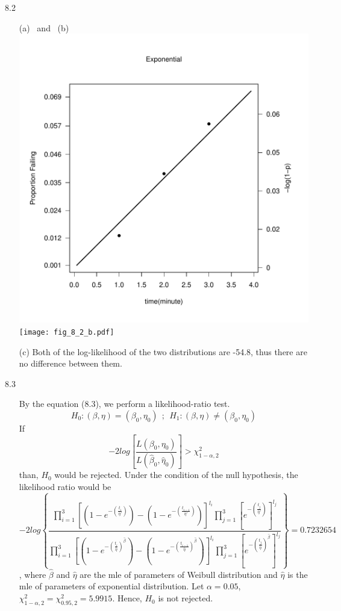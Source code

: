 \documentclass[paper=a4, fontsize=12pt]{scrartcl} %
\numberwithin{equation}{section} %
\numberwithin{figure}{section} %
\numberwithin{table}{section} %
\begin{document}
8.2
\begin{itemize}
	\item[(a)]	\ and \ (b) \\
			\includegraphics[width = .5\textwidth]{fig_8_2_a.pdf}
			\texttt{[image: fig\_8\_2\_b.pdf]}
	\item[(c)]	Both of the log-likelihood of the two distributions are -54.8, thus there are no difference between them.
\end{itemize}

8.3 	
\begin{itemize}
\item[]
	By the equation (8.3), we perform a likelihood-ratio test.
	$$H_0: (\beta, \eta)=(\beta_0, \eta_0)\ \ ;\ \ H_1: (\beta, \eta)\neq(\beta_0, \eta_0) $$
	 If $$-2log\left[ \frac{L(\beta_0, \eta_0)}{L(\widehat{\beta}_0, \widehat{\eta}_0)} \right]>\chi_{1-\alpha, 2}^2$$
	than, $H_0$ would be rejected. Under the condition of the null hypothesis, the likelihood ratio would be
	$$-2log\left\{ \frac{\prod_{i = 1}^3\left[ \left( 1- e^{-\left(\frac{t_i}{\widehat{\eta}\prime}\right)} \right) - \left( 1- e^{-\left(\frac{t_{i-1}}{\widehat{\eta}\prime} \right)} \right) \right]^{l_i}  \prod_{j = 1}^3\left[ e^{-\left(\frac{t_j}{\widehat{\eta}\prime} \right)} \right]^{l_j}}{\prod_{i = 1}^3\left[ \left( 1- e^{-\left(\frac{t_i}{\widehat{\eta}}\right)^{\widehat{\beta}}} \right) - \left( 1- e^{-\left(\frac{t_{i-1}}{\widehat{\eta}} \right)^{\widehat{\beta}}} \right) \right]^{l_i}  \prod_{j = 1}^3\left[ e^{-\left(\frac{t_j}{\widehat{\eta}} \right)^{\widehat{\beta}}} \right]^{l_j}} \right\} = 0.7232654$$, where $\widehat{\beta}$ and $\widehat{\eta}$ are the mle of parameters of Weibull distribution and $\widehat{\eta}$ is the mle of parameters of exponential distribution. Let $\alpha = 0.05$, $\chi_{1-\alpha, 2}^2 = \chi_{0.95, 2}^2 = 5.9915$. Hence, $H_0$ is not rejected.
\end{itemize}
\end{document}
